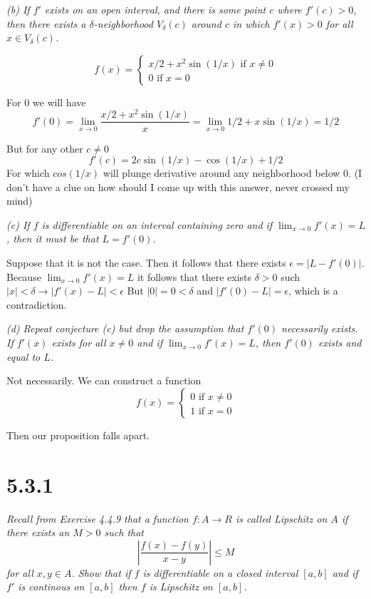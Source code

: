 \documentclass[11pt,oneside,titlepage]{book}
\begin{document}
\textit{(b) If $f'$ exists on an open interval, and there is some point $c$
  where $f'(c) > 0$, then there exists a $\delta$-neighborhood
  $V_\delta(c)$ around $c$ in which $f'(x) > 0$ for all
  $x \in V_\delta(c)$.}

\begin{equation}
  f(x) =
  \begin{cases}
    x/2 + x^2 \sin(1/x)\text{ if } x \neq 0 \\
    0 \text{ if } x = 0
  \end{cases}
\end{equation}

For $0$ we will have
$$f'(0) = \lim_{x \to 0} \frac{x/2 + x^2 \sin(1/x)}{x} =
\lim_{x \to 0} 1/2 + x \sin(1/x) = 1/2$$

But for any other $c \neq 0$
$$f'(c) = 2c\sin(1/x) - \cos(1/x) + 1/2$$
For which $cos(1/x)$ will plunge derivative around any neighborhood below 0.
(I don't have a clue on how should I come up with this answer, never crossed
my mind)

\textit{(c) If $f$ is differentiable on an interval containing zero and if
  $\lim_{x \to 0}f'(x) = L$, then it must be that $L = f'(0)$.}

Suppose that it is not the case. Then it follows that there exists
$\epsilon = |L - f'(0)|$. Because $\lim_{x \to 0}f'(x) = L$ it follows that
there exists $\delta > 0$ such 
$|x| < \delta \to |f'(x) - L| < \epsilon$
But $|0| = 0 < \delta$ and $|f'(0) - L| = \epsilon$, which is a contradiction.

\textit{(d) Repeat conjecture (c) but drop the assumption that $f'(0)$
  necessarily exists. If $f'(x)$ exists for all $x \neq 0$ and if
  $\lim_{x \to 0} f'(x) = L$, then $f'(0)$ exists and equal to $L$.}

Not necessarily. We can construct a function
\begin{equation}
  f(x) =
  \begin{cases}
    0 \text{ if } x \neq 0 \\
    1 \text{ if } x = 0
  \end{cases}
\end{equation}

Then our proposition falls apart.

\section*{5.3.1}
\textit{Recall from Exercise 4.4.9 that a function $f: A \to R$ is called
  Lipschitz on $A$ if there exists an $M > 0$ such that }
$$\left|\frac{f(x) - f(y)}{x - y}\right| \leq M$$
\textit{for all $x, y \in A$. Show that if $f$ is differentiable on a closed
  interval $[a, b]$ and if $f'$ is continous on $[a, b]$ then $f$ is
  Lipschitz on $[a, b]$.}
\end{document}
